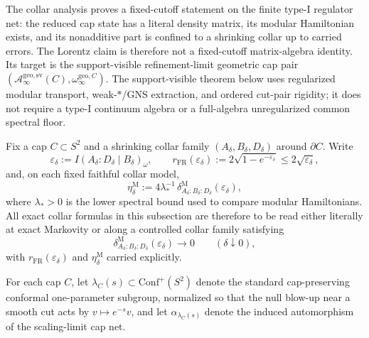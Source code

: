 The collar analysis proves a fixed-cutoff statement on the finite type-I regulator net: the reduced cap state has a literal density matrix, its modular Hamiltonian exists, and its nonadditive part is confined to a shrinking collar up to carried errors. The Lorentz claim is therefore not a fixed-cutoff matrix-algebra identity. Its target is the support-visible refinement-limit geometric cap pair \((\mathcal A_\infty^{\mathrm{geo,sv}}(C),\omega_\infty^{\mathrm{geo},C})\). The support-visible theorem below uses regularized modular transport, weak-\(*\)/GNS extraction, and ordered cut-pair rigidity; it does not require a type-I continuum algebra or a full-algebra unregularized common spectral floor.

Fix a cap \(C\subset S^2\) and a shrinking collar family \((A_\delta,B_\delta,D_\delta)\) around \(\partial C\). Write
\[
\varepsilon_\delta:=I(A_\delta:D_\delta\mid B_\delta)_\omega,
\qquad
r_{\mathrm{FR}}(\varepsilon_\delta):=
2\sqrt{1-e^{-\varepsilon_\delta}}
\le 2\sqrt{\varepsilon_\delta},
\]
and, on each fixed faithful collar model,
\[
\eta_\delta^{\mathrm M}
:=
4\lambda_\ast^{-1}\,
\delta^{\mathrm M}_{A_\delta:B_\delta:D_\delta}(\varepsilon_\delta),
\]
where \(\lambda_\ast>0\) is the lower spectral bound used to compare modular Hamiltonians. All exact collar formulas in this subsection are therefore to be read either literally at exact Markovity or along a controlled collar family satisfying
\[
\delta^{\mathrm M}_{A_\delta:B_\delta:D_\delta}(\varepsilon_\delta)\to 0
\qquad(\delta\downarrow 0),
\]
with \(r_{\mathrm{FR}}(\varepsilon_\delta)\) and \(\eta_\delta^{\mathrm M}\) carried explicitly.

For each cap \(C\), let \(\lambda_C(s)\subset \mathrm{Conf}^+(S^2)\) denote the standard cap-preserving conformal one-parameter subgroup, normalized so that the null blow-up near a smooth cut acts by \(v\mapsto e^{-s}v\), and let \(\alpha_{\lambda_C(s)}\) denote the induced automorphism of the scaling-limit cap net.

